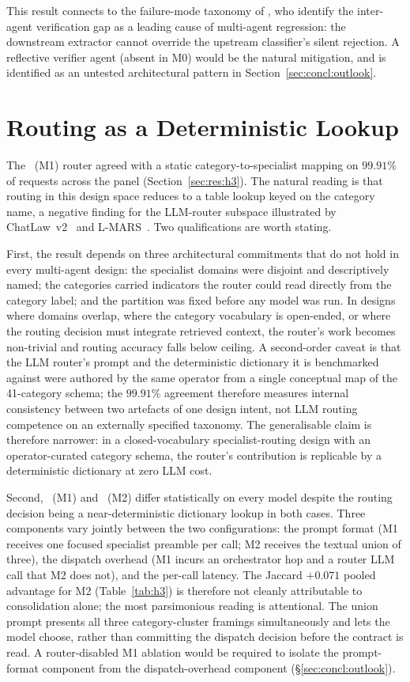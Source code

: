 This result connects to the failure-mode taxonomy of \textcite{cemri2025why},
who identify the inter-agent verification gap as a leading cause of
multi-agent regression: the downstream extractor cannot override the upstream
classifier's silent rejection. A reflective verifier agent (absent in
M0) would be the natural mitigation, and is identified as an untested
architectural pattern in Section~\ref{sec:concl:outlook}.

\section{Routing as a Deterministic Lookup}\label{sec:disc:routing}

The \cfgMA\ (M1) router agreed with a static category-to-specialist mapping on
$99.91\%$ of requests across the panel (Section~\ref{sec:res:h3}).
The natural reading is that routing in this design space reduces to a table
lookup keyed on the category name, a negative finding for the LLM-router
subspace illustrated by ChatLaw~v2~\cite{cui2024chatlaw} and
L-MARS~\cite{wang2025lmars}. Two qualifications are worth stating.

First, the result depends on three architectural commitments that do not hold
in every multi-agent design: the specialist domains were disjoint and
descriptively named; the categories carried indicators the router could read
directly from the category label; and the partition was fixed before any
model was run. In designs where domains overlap, where the category
vocabulary is open-ended, or where the routing decision must integrate
retrieved context, the router's work becomes non-trivial and routing accuracy
falls below ceiling. A second-order caveat is that the LLM router's prompt
and the deterministic dictionary it is benchmarked against were authored by
the same operator from a single conceptual map of the 41-category schema;
the $99.91\%$ agreement therefore measures internal consistency between two
artefacts of one design intent, not LLM routing competence on an externally
specified taxonomy. The generalisable claim is therefore narrower: in a
closed-vocabulary specialist-routing design with an operator-curated category
schema, the router's contribution is replicable by a deterministic
dictionary at zero LLM cost.

Second, \cfgMA\ (M1) and \cfgCP\ (M2) differ statistically on every model
despite the routing decision being a near-deterministic dictionary lookup
in both cases. Three components vary jointly between the two configurations:
the prompt format (M1 receives one focused specialist preamble per call;
M2 receives the textual union of three), the dispatch overhead (M1 incurs
an orchestrator hop and a router LLM call that M2 does not), and the
per-call latency. The Jaccard $+0.071$ pooled advantage for M2
(Table~\ref{tab:h3}) is therefore not cleanly attributable to consolidation
alone; the most parsimonious reading is attentional. The union prompt
presents all three category-cluster framings simultaneously and lets the
model choose, rather than committing the dispatch decision before the
contract is read. A router-disabled M1 ablation would be required to
isolate the prompt-format component from the dispatch-overhead component
(\S\ref{sec:concl:outlook}).

